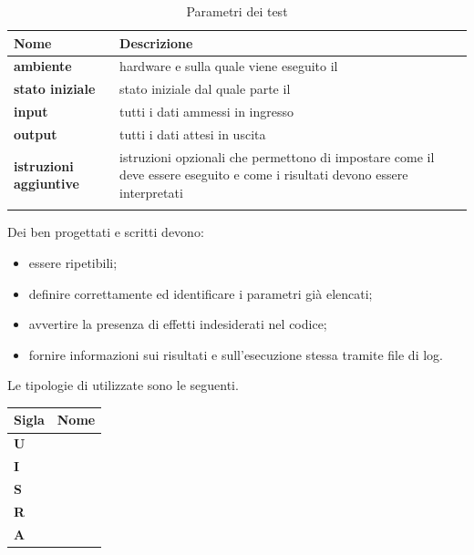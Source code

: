 {{\setlength{\freewidth}{\dimexpr\textwidth-0\tabcolsep}
	\renewcommand{\arraystretch}{1.5}
	\setlength{\aboverulesep}{0pt}
	\setlength{\belowrulesep}{0pt}
	\begin{longtable}{L{.210\freewidth} L{.6\freewidth} L{.080\freewidth}}
		\textbf{Nome} & \textbf{Descrizione} \\
		\toprule
		\endhead		
		\textbf{ambiente} &  hardware e  sulla quale viene eseguito il  \\
		\textbf{stato iniziale} & stato iniziale dal quale parte il  \\
		 \textbf{input} & tutti i dati ammessi in ingresso \\
		\textbf{output} & tutti i dati attesi in uscita \\
		 \textbf{istruzioni aggiuntive} & istruzioni opzionali che permettono di impostare come il  deve essere eseguito e come i risultati devono essere interpretati \\
		\bottomrule
		\hiderowcolors
		\caption{Parametri dei test}
	\end{longtable}


Dei  ben progettati e scritti devono:
\begin{itemize}
	\item essere ripetibili;
	\item definire correttamente ed identificare i parametri già elencati;
	\item avvertire la presenza di effetti indesiderati nel codice;
	\item fornire informazioni sui risultati e sull'esecuzione stessa tramite file di log.
\end{itemize}
Le tipologie di  utilizzate sono le seguenti.

{
\setlength{\freewidth}{\dimexpr\textwidth-0\tabcolsep}
	\renewcommand{\arraystretch}{1.5}
	\setlength{\aboverulesep}{0pt}
	\setlength{\belowrulesep}{0pt}
	\begin{longtable}{L{.2\freewidth} L{0.8\freewidth}}
		\textbf{Sigla} & \textbf{Nome} \\
		\toprule
		\endhead		
		\textbf{U} &  \\
		\textbf{I} &  \\
		 \textbf{S} & \\
		\textbf{R} &  \\
		 \textbf{A} &  \\


\end{longtable}}}}
